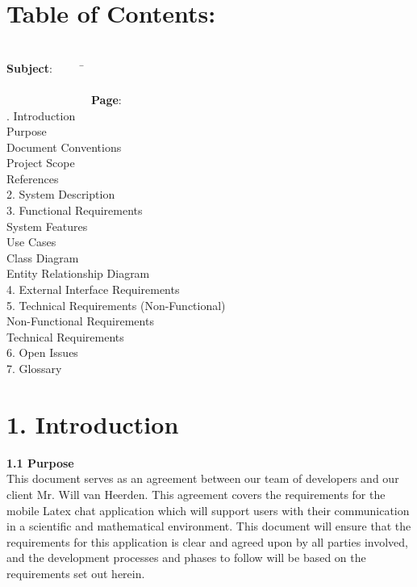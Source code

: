 \documentclass[29pt,a4paper]{moderncv}
\begin{document}
\newpage
\section{\textbf{Table of Contents:}}
\begin{tabbing}
\\\textbf{Subject}: ~~~~~\= ~~~~~~~~~~~~~~~~~~~~~~~~~~~~~~~~~~~~~~~~~~~~~~~~~~~~~~~~~~~~~~~~~~~~~~~~~~~~~~~~~~~~~~~\= \textbf{Page}:
\\. Introduction \> \\							
 Purpose 	\\							
 Document Conventions 					\\
 Project Scope 							\\
 References 						\\
2. System Description \> 					\\
3. Functional Requirements \> \\				
 System Features \\
 Use Cases \\
 Class Diagram \\
 Entity Relationship Diagram \\
4. External Interface Requirements \> \\
5. Technical Requirements (Non-Functional) \> \\
 Non-Functional Requirements \\
 Technical Requirements \\
6. Open Issues \> 			\\				
7. Glossary \>  			\\				

\end{tabbing}
\newpage
	\section*{\textbf{1. Introduction}}
	\vspace{4mm}
	
		\textbf{1.1 Purpose}
			\\This document serves as an agreement between our team of developers and our client Mr. Will van Heerden. This agreement covers the requirements for the mobile Latex chat application which will support users with their communication in a scientific and mathematical environment. This document will ensure that the requirements for this application is clear and agreed upon by all parties involved, and the development processes and phases to follow will be based on the requirements set out herein.\\
		\vspace{1mm}
		
\end{document}
